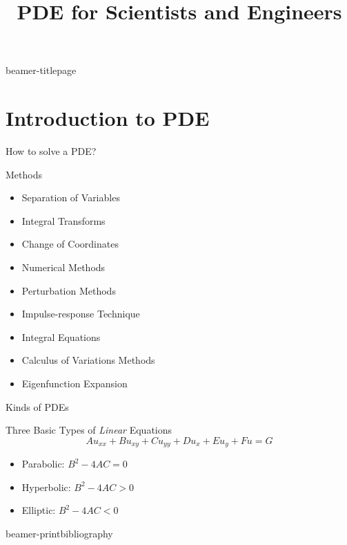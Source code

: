 \documentclass[aspectratio=169]{beamer}
\title{PDE for Scientists and Engineers \autocite{farlow_2012_-PartialDifferentialEquationsScientistsEngineers}}
\begin{document}
{beamer-titlepage}
\section{Introduction to PDE}
\begin{frame}{How to solve a PDE?}
	\begin{block}{Methods}
		\begin{itemize}
			\item Separation of Variables
			\item Integral Transforms
			\item Change of Coordinates
			\item Numerical Methods
			\item Perturbation Methods
			\item Impulse-response Technique
			\item Integral Equations
			\item Calculus of Variations Methods
			\item Eigenfunction Expansion
		\end{itemize}
	\end{block}
\end{frame}

\begin{frame}{Kinds of PDEs}
	\begin{block}{Three Basic Types of \emph{Linear} Equations}
		\begin{equation*}
			Au_{xx} + Bu_{xy} + Cu_{yy} + Du_{x} + Eu_{y} + Fu = G
		\end{equation*}

		\begin{itemize}
			\item Parabolic: $B^{2} - 4AC = 0$
			\item Hyperbolic: $B^{2} - 4AC > 0$
			\item Elliptic: $B^{2} - 4AC < 0$
		\end{itemize}
	\end{block}
\end{frame}
{beamer-printbibliography}
\end{document}
